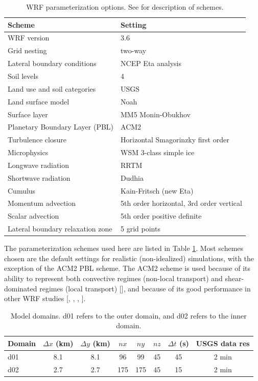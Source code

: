 \begin{table}
\begin{tabular}{l l}
\hline
Scheme & Setting \\ \hline
WRF version & 3.6 \\
Grid nesting & two-way \\
Lateral boundary conditions & NCEP Eta analysis \\
Soil levels & 4 \\
Land use and soil categories & USGS \\
Land surface model & Noah \\
Surface layer & MM5 Monin-Obukhov \\
Planetary Boundary Layer (PBL) & ACM2 \\
Turbulence closure & Horizontal Smagorinzky first order \\
Microphysics & WSM 3-class simple ice \\
Longwave radiation & RRTM \\
Shortwave radiation & Dudhia \\
Cumulus & Kain-Fritsch (new Eta) \\
Momentum advection & 5th order horizontal, 3rd order vertical \\
Scalar advection & 5th order positive definite \\
Lateral boundary relaxation zone & 5 grid points \\
\hline
\end{tabular}
\caption{WRF parameterization options.  See \cite{skamarock2008} for description of schemes.}
\label{table:BL_paramschemes}
\end{table}

The parameterization schemes used here are listed in Table \ref{table:BL_paramschemes}.  Most schemes chosen are the default settings for realistic (non-idealized) simulations, with the exception of the ACM2 PBL scheme. The ACM2 scheme is used because of its ability to represent both convective regimes (non-local transport) and shear-dominated regimes (local transport) [\cite{pleim2007combined}], and because of its good performance in other WRF studies [\cite{xie2012evaluation}, \cite{xie2013structure}, \cite{deppe2013wrf}, \cite{marjanovic2014}].

\begin{table}
\begin{tabular}{ l c c c c c c c }
\hline
Domain & $\Delta x$ (km) & $\Delta y$ (km) & $nx$ & $ny$ & $nz$ & $\Delta t$ (s) & USGS data res \\ \hline
d01 & 8.1 & 8.1 & 96 & 99 & 45 & 45 & 2 min\\
d02 & 2.7 & 2.7 & 175 & 175 & 45 & 15 & 2 min\\
\hline
\end{tabular}
\caption{Model domains. d01 refers to the outer domain, and d02 refers to the inner domain.}
\label{table:BL_domains}
\end{table}

